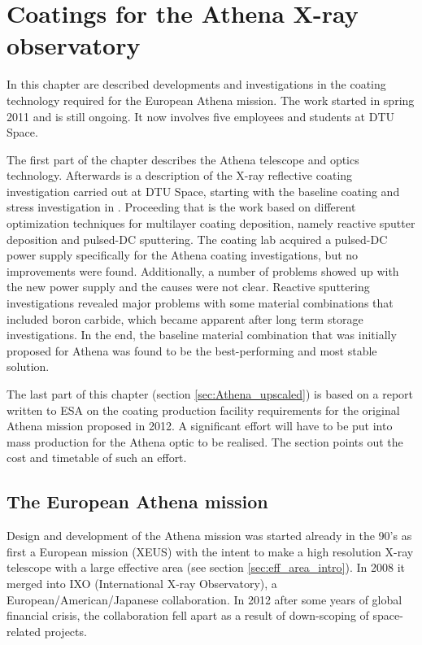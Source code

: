 \chapter{Coatings for the Athena X-ray observatory}\label{chap:Athena_coatings}
In this chapter are described developments and investigations in the coating technology required for the European Athena mission. The work started in spring 2011 and is still ongoing. It now involves five employees and students at DTU Space.

The first part of the chapter describes the Athena telescope and optics technology. Afterwards is a description of the X-ray reflective coating investigation carried out at DTU Space, starting with the baseline coating and stress investigation in \cite{Jakobsen:2011vd}. Proceeding that is the work based on different optimization techniques for multilayer coating deposition, namely reactive sputter deposition and pulsed-DC sputtering. The coating lab acquired a pulsed-DC power supply specifically for the Athena coating investigations, but no improvements were found. Additionally, a number of problems showed up with the new power supply and the causes were not clear. Reactive sputtering investigations revealed major problems with some material combinations that included boron carbide, which became apparent after long term storage investigations. In the end, the baseline material combination that was initially proposed for Athena was found to be the best-performing and most stable solution.

The last part of this chapter (section \ref{sec:Athena_upscaled}) is based on a report written to ESA on the coating production facility requirements for the original Athena mission proposed in 2012. A significant effort will have to be put into mass production for the Athena optic to be realised. The section points out the cost and timetable of such an effort.

\section{The European Athena mission}
Design and development of the Athena mission was started already in the 90's as first a European mission (XEUS) with the intent to make a high resolution X-ray telescope with a large effective area (see section \ref{sec:eff_area_intro}). In 2008 it merged into IXO (International X-ray Observatory), a European/American/Japanese collaboration. In 2012 after some years of global financial crisis, the collaboration fell apart as a result of down-scoping of space-related projects.

